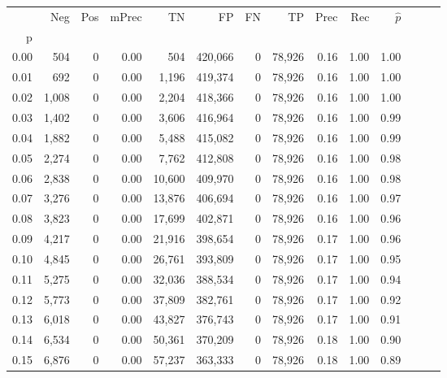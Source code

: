 \begin{tabular}{rrrrrrrrrrrrrr}
\toprule
{} &    Neg &    Pos & mPrec &       TN &       FP &      FN &      TP &  Prec &   Rec & $\hat{p}$ \\
p    &        &        &       &          &          &         &         &       &       &           \\
\midrule
0.00 &    504 &      0 &  0.00 &      504 &  420,066 &       0 &  78,926 &  0.16 &  1.00 &      1.00 \\
0.01 &    692 &      0 &  0.00 &    1,196 &  419,374 &       0 &  78,926 &  0.16 &  1.00 &      1.00 \\
0.02 &  1,008 &      0 &  0.00 &    2,204 &  418,366 &       0 &  78,926 &  0.16 &  1.00 &      1.00 \\
0.03 &  1,402 &      0 &  0.00 &    3,606 &  416,964 &       0 &  78,926 &  0.16 &  1.00 &      0.99 \\
0.04 &  1,882 &      0 &  0.00 &    5,488 &  415,082 &       0 &  78,926 &  0.16 &  1.00 &      0.99 \\
0.05 &  2,274 &      0 &  0.00 &    7,762 &  412,808 &       0 &  78,926 &  0.16 &  1.00 &      0.98 \\
0.06 &  2,838 &      0 &  0.00 &   10,600 &  409,970 &       0 &  78,926 &  0.16 &  1.00 &      0.98 \\
0.07 &  3,276 &      0 &  0.00 &   13,876 &  406,694 &       0 &  78,926 &  0.16 &  1.00 &      0.97 \\
0.08 &  3,823 &      0 &  0.00 &   17,699 &  402,871 &       0 &  78,926 &  0.16 &  1.00 &      0.96 \\
0.09 &  4,217 &      0 &  0.00 &   21,916 &  398,654 &       0 &  78,926 &  0.17 &  1.00 &      0.96 \\
0.10 &  4,845 &      0 &  0.00 &   26,761 &  393,809 &       0 &  78,926 &  0.17 &  1.00 &      0.95 \\
0.11 &  5,275 &      0 &  0.00 &   32,036 &  388,534 &       0 &  78,926 &  0.17 &  1.00 &      0.94 \\
0.12 &  5,773 &      0 &  0.00 &   37,809 &  382,761 &       0 &  78,926 &  0.17 &  1.00 &      0.92 \\
0.13 &  6,018 &      0 &  0.00 &   43,827 &  376,743 &       0 &  78,926 &  0.17 &  1.00 &      0.91 \\
0.14 &  6,534 &      0 &  0.00 &   50,361 &  370,209 &       0 &  78,926 &  0.18 &  1.00 &      0.90 \\
0.15 &  6,876 &      0 &  0.00 &   57,237 &  363,333 &       0 &  78,926 &  0.18 &  1.00 &      0.89 \\

\end{tabular}

